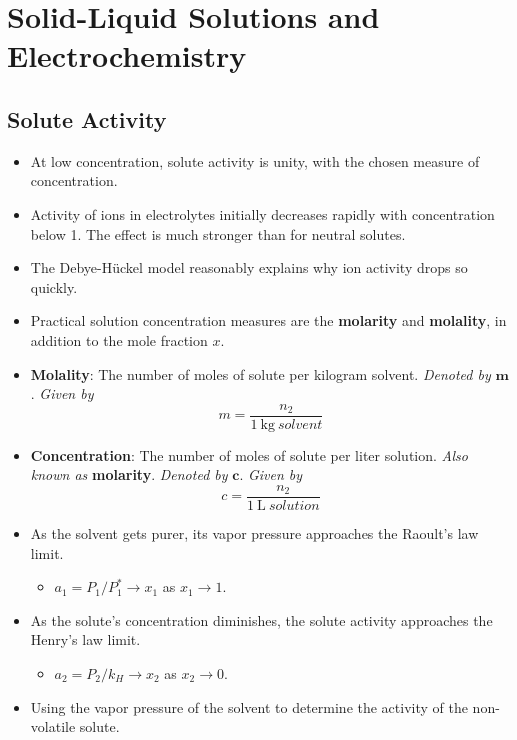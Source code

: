 \documentclass[../notes.tex]{subfiles}
\begin{document}
\chapter{Solid-Liquid Solutions and Electrochemistry}
\section{Solute Activity}
\begin{itemize}
    \item {}At low concentration, solute activity is unity, with the chosen measure of concentration.
    \item Activity of ions in electrolytes initially decreases rapidly with concentration below \SI{1}{\molar}. The effect is much stronger than for neutral solutes.
    \item The Debye-H\"{u}ckel model reasonably explains why ion activity drops so quickly.
    \item Practical solution concentration measures are the \textbf{molarity} and \textbf{molality}, in addition to the mole fraction $x$.
    \item \textbf{Molality}: The number of moles of solute per kilogram solvent. \emph{Denoted by} $\bm{m}$. \emph{Given by}
    \begin{equation*}
        m = \frac{n_2}{\SI{1}{\kilo\gram\ solvent}}
    \end{equation*}
    \item \textbf{Concentration}: The number of moles of solute per liter solution. \emph{Also known as} \textbf{molarity}. \emph{Denoted by} $\bm{c}$. \emph{Given by}
    \begin{equation*}
        c = \frac{n_2}{\SI{1}{\liter\ solution}}
    \end{equation*}
    \item As the solvent gets purer, its vapor pressure approaches the Raoult's law limit.
    \begin{itemize}
        \item $a_1=P_1/P_1^*\to x_1$ as $x_1\to 1$.
    \end{itemize}
    \item As the solute's concentration diminishes, the solute activity approaches the Henry's law limit.
    \begin{itemize}
        \item $a_2=P_2/k_H\to x_2$ as $x_2\to 0$.
    \end{itemize}
    \item Using the vapor pressure of the solvent to determine the activity of the non-volatile solute.

\end{itemize}
\end{document}
